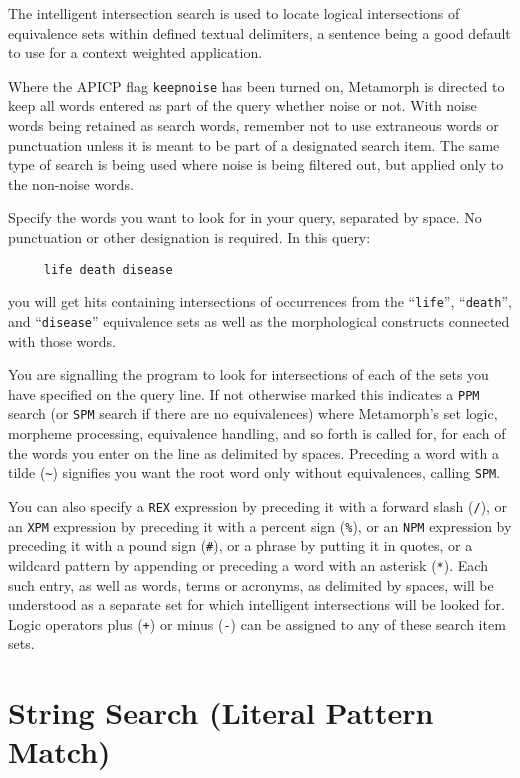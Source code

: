 The intelligent intersection search is used to locate logical
intersections of equivalence sets within defined textual delimiters, a
sentence being a good default to use for a context weighted
application.

Where the APICP flag \verb`keepnoise` has been turned on, Metamorph is
directed to keep all words entered as part of the query whether noise
or not.  With noise words being retained as search words, remember not
to use extraneous words or punctuation unless it is meant to be part
of a designated search item.  The same type of search is being used
where noise is being filtered out, but applied only to the non-noise
words.

Specify the words you want to look for in your query, separated by
space.  No punctuation or other designation is required.  In this
query:

\begin{verbatim}
     life death disease
\end{verbatim}
you will get hits containing intersections of occurrences from the ``\verb`life`'',
``\verb`death`'', and ``\verb`disease`'' equivalence sets as well as the morphological
constructs connected with those words.

You are signalling the program to look for intersections of each of
the sets you have specified on the query line.  If not otherwise
marked this indicates a \verb`PPM` search (or \verb`SPM` search if
there are no equivalences) where Metamorph's set logic, morpheme
processing, equivalence handling, and so forth is called for, for each
of the words you enter on the line as delimited by spaces.  Preceding
a word with a tilde (\verb`~`) signifies you want the root word only
without equivalences, calling \verb`SPM`.

You can also specify a \verb`REX` expression by preceding it with a
forward slash (\verb`/`), or an \verb`XPM` expression by preceding it
with a percent sign (\verb`%`), or an \verb`NPM` expression by
preceding it with a pound sign (\verb`#`), or a phrase by putting it
in quotes, or a wildcard pattern by appending or preceding a word with
an asterisk (\verb`*`).  Each such entry, as well as words, terms or
acronyms, as delimited by spaces, will be understood as a separate set
for which intelligent intersections will be looked for.  Logic
operators plus (\verb`+`) or minus (\verb`-`) can be assigned to any
of these search item sets.


\section{String Search (Literal Pattern Match)}

